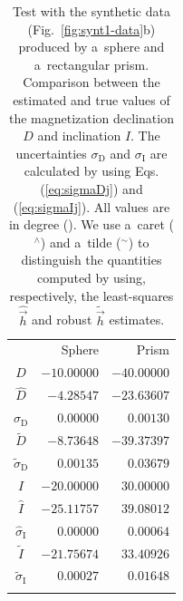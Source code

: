 \documentclass[journal abbreviation, npg]{copernicus}
\begin{document}
\begin{table}[t]
\caption{Test with the synthetic data (Fig.~\ref{fig:synt1-data}b) produced
by a~sphere and a~rectangular prism. Comparison between the estimated and
true values of the magnetization declination $D$ and inclination $I$. The
uncertainties $\sigma_\mathrm{D}$ and $\sigma_\mathrm{I}$ are calculated by
using Eqs. (\ref{eq:sigmaDj}) and (\ref{eq:sigmaIj}). All values are in
degree ({\degree}). We use a~caret ($^{\wedge}$) and a~tilde ($^{\sim}$) to
distinguish the quantities computed by using, respectively, the least-squares
$\hat{\vec{h}}$ and robust $\tilde{\vec{h}}$ estimates.}
\begin{tabular}{crr}
\tophline
&Sphere &Prism \\
\middlehline
$D$ &$-10.00000$ &$-40.00000$ \\
$\hat{D}$ &$-4.28547$ &$-23.63607$ \\
$\hat{\sigma}_\mathrm{D}$ &$0.00000$ &$0.00130$  \\
$\tilde{D}$ &$-8.73648$ &$-39.37397$ \\
$\tilde{\sigma}_\mathrm{D}$ &$0.00135$ &$0.03679$ \\
$I$ &$-20.00000$ &$30.00000$ \\
$\hat{I}$ &$-25.11757$ &$39.08012$  \\
$\hat{\sigma}_\mathrm{I}$ &$0.00000$ &$0.00064$  \\
$\tilde{I}$ &$-21.75674$ &$33.40926$ \\
$\tilde{\sigma}_\mathrm{I}$ &$0.00027$ &$0.01648$ \\
\bottomhline
\end{tabular}
\label{tab:synt1-with-inter-anomaly}
\end{table}

\end{document}
